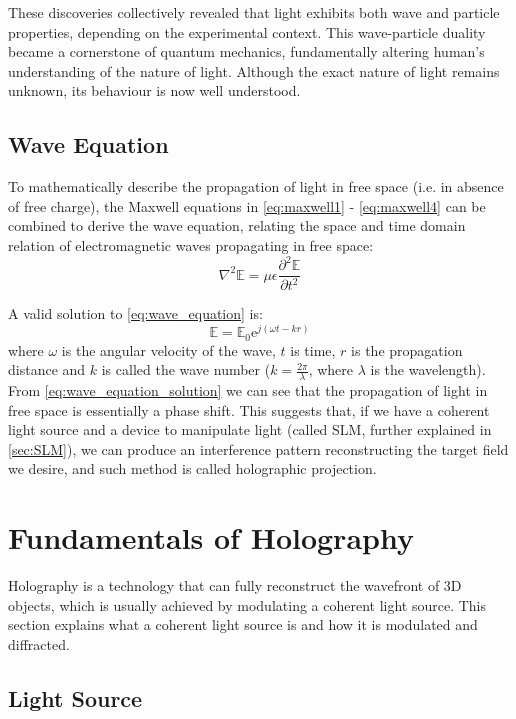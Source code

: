 These discoveries collectively revealed that light exhibits both wave and particle properties, depending on the experimental context. This wave-particle duality became a cornerstone of quantum mechanics, fundamentally altering human's understanding of the nature of light. Although the exact nature of light remains unknown, its behaviour is now well understood.

\subsection{Wave Equation}
To mathematically describe the propagation of light in free space (i.e. in absence of free charge), the Maxwell equations in \cref{eq:maxwell1} - \cref{eq:maxwell4} can be combined to derive the wave equation, relating the space and time domain relation of electromagnetic waves propagating in free space:
\begin{equation}
  \nabla^2 \mathbb{E} = \mu \epsilon \frac{\partial^2 \mathbb{E}}{\partial t^2} \label{eq:wave_equation}
\end{equation}

A valid solution to \cref{eq:wave_equation} is:
\begin{equation}
  \mathbb{E} = \mathbb{E}_0 \mathrm{e}^{j(\omega t - k r)} \label{eq:wave_equation_solution}
\end{equation}
where $\omega$ is the angular velocity of the wave, $t$ is time, $r$ is the propagation distance and $k$ is called the wave number ($k=\frac{2\pi}{\lambda}$, where $\lambda$ is the wavelength). From \cref{eq:wave_equation_solution} we can see that the propagation of light in free space is essentially a phase shift. This suggests that, if we have a coherent light source and a device to manipulate light (called SLM, further explained in \cref{sec:SLM}), we can produce an interference pattern reconstructing the target field we desire, and such method is called holographic projection.


\newpage
\section{Fundamentals of Holography}
Holography is a technology that can fully reconstruct the wavefront of 3D objects, which is usually achieved by modulating a coherent light source. This section explains what a coherent light source is and how it is modulated and diffracted.

\subsection{Light Source} \label{sec:Light Source}

